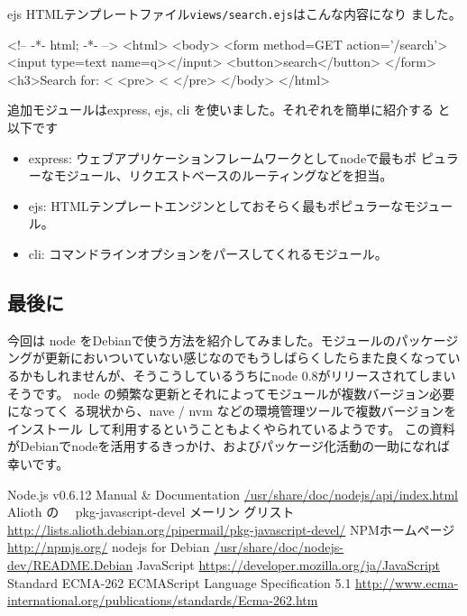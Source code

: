 \documentclass[mingoth,a4paper]{jsarticle}
\begin{document}
ejs HTMLテンプレートファイル\texttt{views/search.ejs}はこんな内容になり
ました。

\begin{commandline}
<!-- -*- html; -*- -->
<html>
  <body>
    <form
      method=GET
      action='/search'>
      <input type=text name=q></input>
      <button>search</button>
    </form>
    <h3>Search for: <%
    <pre>
<%
    </pre>
  </body>
</html>
\end{commandline}

追加モジュールはexpress, ejs, cli を使いました。それぞれを簡単に紹介する
と以下です

\begin{itemize}
 \item express: ウェブアプリケーションフレームワークとしてnodeで最もポ
       ピュラーなモジュール、リクエストベースのルーティングなどを担当。
 \item ejs: HTMLテンプレートエンジンとしておそらく最もポピュラーなモジュール。
 \item cli: コマンドラインオプションをパースしてくれるモジュール。
\end{itemize}


\subsection{最後に}

今回は node をDebianで使う方法を紹介してみました。モジュールのパッケージ
ングが更新においついていない感じなのでもうしばらくしたらまた良くなってい
るかもしれませんが、そうこうしているうちにnode 0.8がリリースされてしまい
そうです。
node の頻繁な更新とそれによってモジュールが複数バージョン必要になってく
る現状から、nave / nvm などの環境管理ツールで複数バージョンをインストール
して利用するということもよくやられているようです。
この資料がDebianでnodeを活用するきっかけ、およびパッケージ化活動の一助になれば幸いです。

\begin{thebibliography}{0}
  Node.js v0.6.12 Manual \& Documentation
	\url{/usr/share/doc/nodejs/api/index.html}
 Alioth の 　pkg-javascript-devel メーリン
	グリスト
	\url{http://lists.alioth.debian.org/pipermail/pkg-javascript-devel/}
 NPMホームページ \url{http://npmjs.org/}
 nodejs for Debian
	\url{/usr/share/doc/nodejs-dev/README.Debian}
 JavaScript \url{https://developer.mozilla.org/ja/JavaScript}
 Standard ECMA-262
ECMAScript Language Specification 5.1
\url{http://www.ecma-international.org/publications/standards/Ecma-262.htm}
\end{thebibliography}
\end{document}
